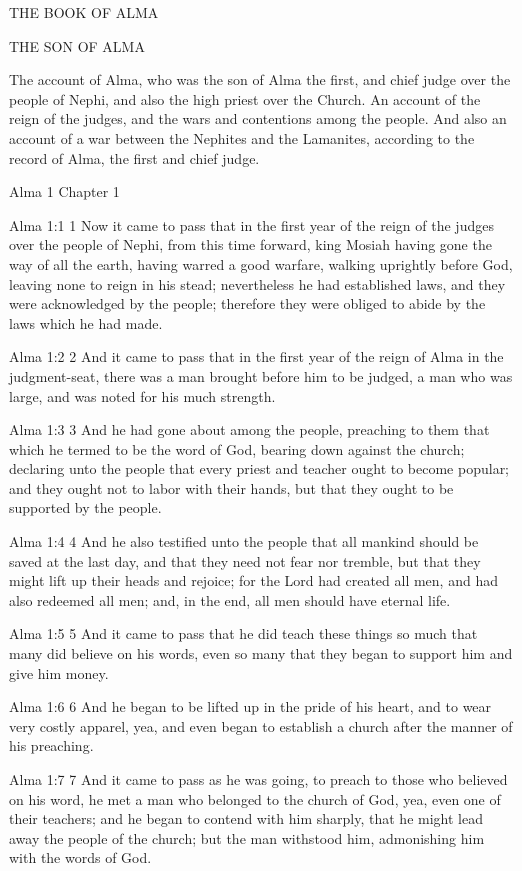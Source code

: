 THE BOOK OF ALMA

THE SON OF ALMA

The account of Alma, who was the son of Alma the first, and chief
judge over the people of Nephi, and also the high priest over the
Church.  An account of the reign of the judges, and the wars and
contentions among the people.  And also an account of a war
between the Nephites and the Lamanites, according to the record
of Alma, the first and chief judge.

Alma 1
Chapter 1

Alma 1:1
 1 Now it came to pass that in the first year of the reign of the
judges over the people of Nephi, from this time forward, king
Mosiah having gone the way of all the earth, having warred a good
warfare, walking uprightly before God, leaving none to reign in
his stead; nevertheless he had established laws, and they were
acknowledged by the people; therefore they were obliged to abide
by the laws which he had made.

Alma 1:2
 2 And it came to pass that in the first year of the reign of
Alma in the judgment-seat, there was a man brought before him to
be judged, a man who was large, and was noted for his much
strength.

Alma 1:3
 3 And he had gone about among the people, preaching to them that
which he termed to be the word of God, bearing down against the
church; declaring unto the people that every priest and teacher
ought to become popular; and they ought not to labor with their
hands, but that they ought to be supported by the people.

Alma 1:4
 4 And he also testified unto the people that all mankind should
be saved at the last day, and that they need not fear nor
tremble, but that they might lift up their heads and rejoice; for
the Lord had created all men, and had also redeemed all men; and,
in the end, all men should have eternal life.

Alma 1:5
 5 And it came to pass that he did teach these things so much
that many did believe on his words, even so many that they began
to support him and give him money.

Alma 1:6
 6 And he began to be lifted up in the pride of his heart, and to
wear very costly apparel, yea, and even began to establish a
church after the manner of his preaching.

Alma 1:7
 7 And it came to pass as he was going, to preach to those who
believed on his word, he met a man who belonged to the church of
God, yea, even one of their teachers; and he began to contend
with him sharply, that he might lead away the people of the
church; but the man withstood him, admonishing him with the words
of God.

